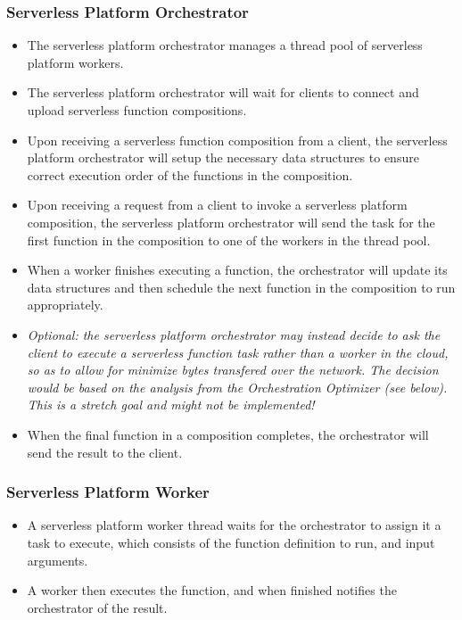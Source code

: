 \documentclass[12pt]{article}
\begin{document}
\subsubsection{Serverless Platform Orchestrator}
\begin{itemize}
  \item The serverless platform orchestrator manages
  a thread pool of serverless platform workers.
  \item The serverless platform orchestrator will wait for clients to connect
  and upload serverless function compositions.
  \item Upon receiving a serverless function composition from a
  client, the serverless platform orchestrator 
  will setup the necessary data structures to ensure 
  correct execution order of the functions in the composition.
  \item Upon receiving a request from a client to invoke
  a serverless platform composition, the serverless platform
  orchestrator will send the task for the first function in the composition
  to one of the workers in the thread pool.
  \item When a worker finishes executing a function,
  the orchestrator will update its data structures
  and then schedule the next function in the composition
  to run appropriately.
  \item \emph{Optional: the serverless platform orchestrator
  may instead decide to ask the client to execute a serverless
  function task rather than a worker in the cloud, so as to
  allow for minimize bytes transfered over the network.
  The decision would be based on the analysis from the Orchestration
  Optimizer (see below).
  This is a stretch goal and might not be implemented!} 
  \item When the final function in a composition completes,
  the orchestrator will send the result to the client.
\end{itemize}

\subsubsection{Serverless Platform Worker}
\begin{itemize}
  \item A serverless platform worker thread waits for the
  orchestrator to assign it a task to execute, which consists of
  the function definition to run, and input arguments.
  \item A worker then executes the function, and when finished
  notifies the orchestrator of the result.
\end{itemize}
\end{document}
